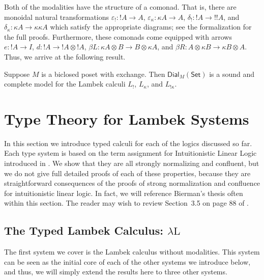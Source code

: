 \documentclass{llncs}
\let\mto\to                     %
\let\to\relax                   %
\newcommand{\to}{\rightarrow}
\newcommand{\Set}{\mathsf{Set}}
\newcommand{\Dial}[2]{\mathsf{Dial}_{#1}(#2)}
\begin{document}
Both of the modalities have the structure of a comonad.  That is,
there are monoidal natural transformations $\varepsilon_! : !A \mto
A$, $\varepsilon_\kappa : \kappa A \mto A$, $\delta_! : !A \mto !!A$,
and $\delta_\kappa : \kappa A \mto \kappa\kappa A$ which satisfy the
appropriate diagrams; see the formalization for the full
proofs. Furthermore, these comonads come equipped with arrows $e : !A
\mto I$, $d : !A \mto !A \otimes !A$, $\beta L : \kappa A \otimes B \mto B
\otimes \kappa A$, and $\beta R : A \otimes \kappa B \mto \kappa B
\otimes A$.  Thus, we arrive at the following result.

\begin{theorem}
  \label{thm:sound-dial-exchange-!}
  Suppose $M$ is a biclosed poset with exchange.  Then
  $\Dial{M}{\Set}$ is a sound and complete model for the Lambek
  calculi $L_!$, $L_\kappa$, and $L_{!\kappa}$.
\end{theorem}

\section{Type Theory for Lambek Systems}
\label{sec:typed_lambek_calculi}
In this section we introduce typed calculi for each of the logics
discussed so far.  Each type system is based on the term assignment
for  Intuitionistic Linear Logic introduced 
in \cite{benton1993}.
We show that they are all strongly normalizing
and confluent, but we do not give full detailed proofs of each of
these properties, because they are straightforward consequences of the
proofs of strong normalization and confluence for intuitionistic
linear logic.  In fact, we will reference Bierman's thesis often
within this section.  The reader may wish to review Section~3.5 on
page 88 of \cite{Bierman:1994}.

\subsection{The Typed Lambek Calculus: $\lambda\text{L}$}
\label{subsec:the_typed_lambek_calculus_lambda-l}

The first system we cover is the Lambek calculus without
modalities. This system can be seen as the initial core of each of the
other systems we introduce below, and thus, we will simply extend the
results here to three other systems.  
\end{document}
